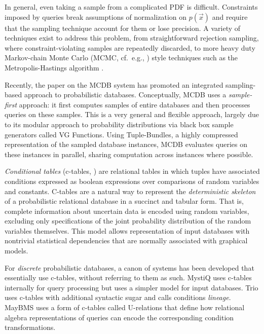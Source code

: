 In general, even taking a sample from a complicated PDF is difficult.  Constraints imposed by queries break assumptions of normalization on $p(\vec x)$ and require that the sampling technique account for them or lose precision.  A variety of techniques exist to address this problem, from straightforward rejection sampling, where constraint-violating samples are repeatedly discarded, to more heavy duty Markov-chain Monte Carlo (MCMC, cf.\ e.g., \cite{GRS1995}) style techniques such as the Metropolis-Hastings algorithm \cite{metropolis,GRS1995}. 

Recently,  the paper  \cite{MCDB} on  the MCDB  system  has promoted an integrated  sampling-based  approach to  probabilistic databases.  Conceptually,  MCDB uses a {\em sample-first}\/ approach: it   first  computes  samples  of  entire databases and then processes queries  on these samples.  This is a very general and flexible approach, largely due to its modular approach to probability distributions via black box sample generators called VG Functions.  Using Tuple-Bundles, a highly compressed representation of the sampled database instances, MCDB evaluates queries on these instances in parallel, sharing computation across instances where possible.  

{\em  Conditional tables}\/  (c-tables, \cite{IL1984})  are relational tables in which tuples have associated conditions expressed as boolean expressions over  comparisons of random variables  and constants. C-tables are a natural way to  represent  the  {\em  deterministic skeleton}\/  of a probabilistic relational  database in  a succinct  and tabular  form.  That  is, complete information  about uncertain data is encoded using random  variables, excluding only  specifications  of the  joint  probability  distribution of  the random  variables   themselves.   This  model   allows  representation of  input databases  with  nontrivial statistical  dependencies that are normally associated with graphical models. 

For {\em discrete} probabilistic  databases, a canon of systems has been developed that essentially use c-tables, without referring to them as such. MystiQ  \cite{dalvi07efficient}  uses  c-tables internally  for  query processing  but  uses  a  simpler  model for  input  databases.   Trio \cite{WidomTrio2008}  uses  c-tables with  additional  syntactic sugar  and calls conditions {\em lineage}\/.  MayBMS \cite{AJKO2008}  uses a  form of  c-tables called  U-relations that define how relational algebra representations of queries can encode the corresponding condition transformations.

